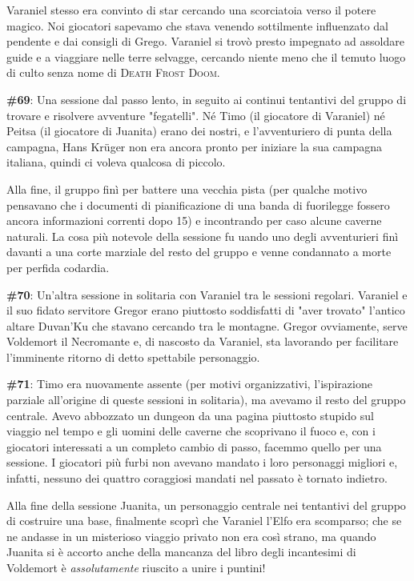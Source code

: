 Varaniel stesso era convinto di star cercando una scorciatoia verso il potere magico. Noi giocatori sapevamo che stava venendo sottilmente influenzato dal pendente e dai consigli di Grego. Varaniel si trovò presto impegnato ad assoldare guide e a viaggiare nelle terre selvagge, cercando niente meno che il temuto luogo di culto senza nome di \textsc{Death Frost Doom}.

\textbf{\#69}: Una sessione dal passo lento, in seguito ai continui tentantivi del gruppo di trovare e risolvere avventure "fegatelli". Né Timo (il giocatore di Varaniel) né Peitsa (il giocatore di Juanita) erano dei nostri, e l'avventuriero di punta della campagna, Hans Krüger non era ancora pronto per iniziare la sua campagna italiana, quindi ci voleva qualcosa di piccolo.

Alla fine, il gruppo finì per battere una vecchia pista (per qualche motivo pensavano che i documenti di pianificazione di una banda di fuorilegge fossero ancora informazioni correnti dopo 15) e incontrando per caso alcune caverne naturali. La cosa più notevole della sessione fu uando uno degli avventurieri finì davanti a una corte marziale del resto del gruppo e venne condannato a morte per perfida codardia.

\textbf{\#70}: Un'altra sessione in solitaria con Varaniel tra le sessioni regolari. Varaniel e il suo fidato servitore Gregor erano piuttosto soddisfatti di "aver trovato" l'antico altare Duvan'Ku che stavano cercando tra le montagne. Gregor ovviamente, serve Voldemort il Necromante e, di nascosto da Varaniel, sta lavorando per facilitare l'imminente ritorno di detto spettabile personaggio.

\textbf{\#71}: Timo era nuovamente assente (per motivi organizzativi, l'ispirazione parziale all'origine di queste sessioni in solitaria), ma avevamo il resto del gruppo centrale. Avevo abbozzato un dungeon da una pagina piuttosto stupido sul viaggio nel tempo e gli uomini delle caverne che scoprivano il fuoco e, con i giocatori interessati a un completo cambio di passo, facemmo quello per una sessione. I giocatori più furbi non avevano mandato i loro personaggi migliori e, infatti, nessuno dei quattro coraggiosi mandati nel passato è tornato indietro.

Alla fine della sessione Juanita, un personaggio centrale nei tentantivi del gruppo di costruire una base, finalmente scoprì che Varaniel l'Elfo era scomparso; che se ne andasse in un misterioso viaggio privato non era così strano, ma quando Juanita si è accorto anche della mancanza del libro degli incantesimi di Voldemort è \textit{assolutamente} riuscito a unire i puntini!

